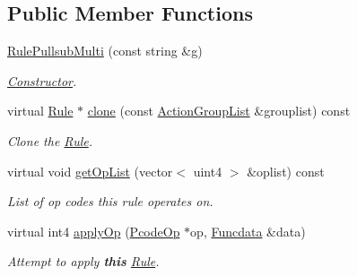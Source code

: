 \subsection*{Public Member Functions}
\begin{DoxyCompactItemize}
\item 
\mbox{\hyperlink{class_rule_pullsub_multi_add0825c4eecde38ebf6fd264ead8510b}{Rule\+Pullsub\+Multi}} (const string \&g)
\begin{DoxyCompactList}\small\item\em \mbox{\hyperlink{class_constructor}{Constructor}}. \end{DoxyCompactList}\item 
virtual \mbox{\hyperlink{class_rule}{Rule}} $\ast$ \mbox{\hyperlink{class_rule_pullsub_multi_ad97158dddae367b04cc50438c4380033}{clone}} (const \mbox{\hyperlink{class_action_group_list}{Action\+Group\+List}} \&grouplist) const
\begin{DoxyCompactList}\small\item\em Clone the \mbox{\hyperlink{class_rule}{Rule}}. \end{DoxyCompactList}\item 
virtual void \mbox{\hyperlink{class_rule_pullsub_multi_a41fa2a5dcee23ca0a9a831982c9b2b0f}{get\+Op\+List}} (vector$<$ uint4 $>$ \&oplist) const
\begin{DoxyCompactList}\small\item\em List of op codes this rule operates on. \end{DoxyCompactList}\item 
virtual int4 \mbox{\hyperlink{class_rule_pullsub_multi_ae66401a1bda28e0332a3058b276fdca5}{apply\+Op}} (\mbox{\hyperlink{class_pcode_op}{Pcode\+Op}} $\ast$op, \mbox{\hyperlink{class_funcdata}{Funcdata}} \&data)
\begin{DoxyCompactList}\small\item\em Attempt to apply {\bfseries{this}} \mbox{\hyperlink{class_rule}{Rule}}. \end{DoxyCompactList}\end{DoxyCompactItemize}

